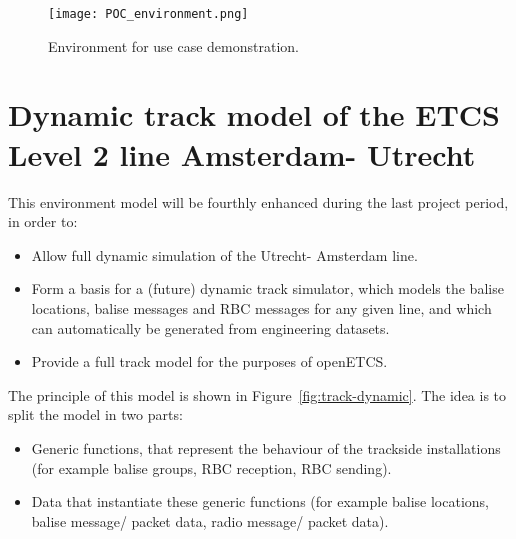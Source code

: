 	
\begin{figure}
  \centering
  \texttt{[image: POC\_environment.png]}
  \caption{Environment for use case demonstration.}
  \label{fig:WP3-demo}
\end{figure}


\section{Dynamic track model of the ETCS Level 2 line Amsterdam- Utrecht}

This environment model will be fourthly enhanced during the last project period, in order to:
\begin{itemize}
\item Allow full dynamic simulation of the Utrecht- Amsterdam line.
\item Form a basis for a (future) dynamic track simulator, which models the balise locations, balise messages and RBC messages for any given line, and which can automatically be generated from engineering datasets.
\item Provide a full track model for the purposes of openETCS.
\end{itemize}

The principle of this model is shown in Figure~\ref{fig:track-dynamic}. 
The idea is to split the model in two parts:
\begin{itemize}
\item Generic functions, that represent the behaviour of the trackside installations (for example balise groups, RBC reception, RBC sending).
\item Data that instantiate these generic functions (for example balise locations, balise message/ packet data, radio message/ packet data).
\end{itemize}

